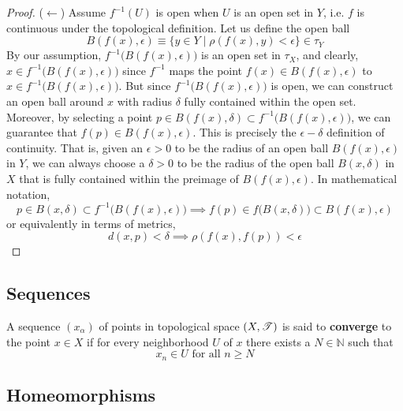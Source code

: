 \begin{proof}
    ($\leftarrow$) Assume $f^{-1}(U)$ is open when $U$ is an open set in $Y$, i.e. $f$ is continuous under the topological definition. Let us define the open ball 
    \[ B(f(x), \epsilon) \equiv \{ y \in Y \; | \; \rho(f(x), y) < \epsilon\} \in \tau_Y\]
    By our assumption, $f^{-1} \big( B(f(x), \epsilon) \big)$ is an open set in $\tau_X$, and clearly, $x \in f^{-1} \big( B(f(x), \epsilon) \big)$ since $f^{-1}$ maps the point $f(x) \in B(f(x), \epsilon)$ to $x \in f^{-1} \big( B(f(x), \epsilon) \big)$. But since $f^{-1} \big( B(f(x), \epsilon) \big)$ is open, we can construct an open ball around $x$ with radius $\delta$ fully contained within the open set. Moreover, by selecting a point $p \in B(f(x), \delta) \subset f^{-1}\big( B(f(x), \epsilon) \big)$, we can guarantee that $f(p) \in B(f(x), \epsilon)$. This is precisely the $\epsilon - \delta$ definition of continuity. That is, given an $\epsilon > 0$ to be the radius of an open ball $B(f(x), \epsilon)$ in $Y$, we can always choose a $\delta > 0$ to be the radius of the open ball $B(x, \delta)$ in $X$ that is fully contained within the preimage of $B(f(x), \epsilon)$. In mathematical notation, 
    \[ p \in B(x, \delta) \subset f^{-1} \big( B(f(x), \epsilon) \big) \implies f(p) \in f\big( B(x, \delta) \big) \subset B(f(x), \epsilon)\]
    or equivalently in terms of metrics,
    \[ d(x, p) < \delta \implies \rho (f(x), f(p)) < \epsilon\]
  \end{proof} 

\subsection{Sequences}

  \begin{definition}[Sequence]
    A sequence $(x_\alpha)$ of points in topological space $(X, \T)$ is said to \textbf{converge} to the point $x \in X$ if for every neighborhood $U$ of $x$ there exists a $N \in \mathbb{N}$ such that
    \begin{equation}
      x_n \in U \text{ for all } n \geq N
    \end{equation}
  \end{definition}

\subsection{Homeomorphisms}

